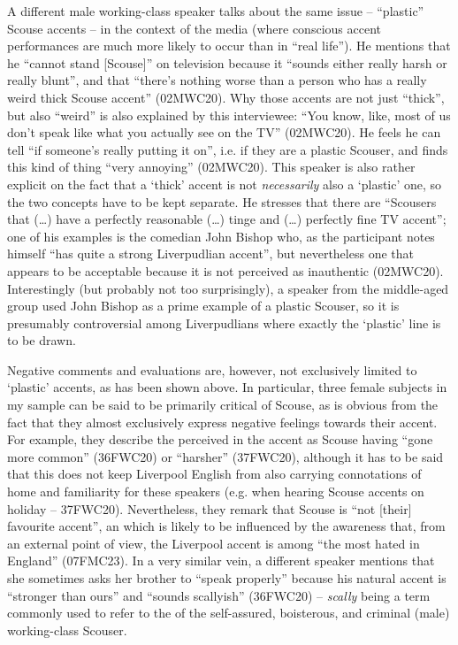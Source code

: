 A different male working-class speaker talks about the same issue -- ``plastic'' Scouse accents -- in the context of the media (where conscious accent perfor\-mances are much more likely to occur than in ``real life'').
He mentions that he ``cannot stand [Scouse]'' on television because it ``sounds either really harsh or really blunt'', and that ``there's nothing worse than a person who has a really weird thick Scouse accent'' (02MWC20).
Why those accents are not just ``thick'', but also ``weird'' is also explained by this interviewee: ``You know, like, most of us don't speak like what you actually see on the TV'' (02MWC20).
He feels he can tell ``if someone's really putting it on'', i.e. if they are a plastic Scouser, and finds this kind of thing ``very annoying'' (02MWC20).
This speaker is also rather explicit on the fact that a `thick' accent is not \emph{necessarily} also a `plastic' one, so the two concepts have to be kept separate.
He stresses that there are ``Scousers that (\ldots) have a perfectly reasonable (\ldots) tinge and (\ldots) perfectly fine TV accent''; one of his examples is the comedian John Bishop who, as the participant notes himself ``has quite a strong Liverpudlian accent'', but nevertheless one that appears to be acceptable because it is not perceived as inauthentic (02MWC20).
Interestingly (but probably not too surprisingly), a speaker from the middle-aged group used John Bishop as a prime example of a plastic Scouser, so it is presumably controversial among Liverpudlians where exactly the `plastic' line is to be drawn.

Negative comments and evaluations are, however, not exclusively limited to `plastic' accents, as has been shown above.
In particular, three female subjects in my sample can be said to be primarily critical of Scouse, as is obvious from the fact that they almost exclusively express negative feelings towards their accent.
For example, they describe the perceived  in the accent as Scouse having ``gone more common'' (36FWC20) or ``harsher'' (37FWC20), although it has to be said that this does not keep Liverpool English from also carrying connotations of home and familiarity for these speakers (e.g. when hearing Scouse accents on holiday -- 37FWC20).
Nevertheless, they remark that Scouse is ``not [their] favourite accent'', an  which is likely to be influenced by the awareness that, from an external point of view, the Liverpool accent is among ``the most hated in England'' (07FMC23).
In a very similar vein, a different speaker mentions that she sometimes asks her brother to ``speak properly'' because his natural accent is ``stronger than ours'' and ``sounds scallyish'' (36FWC20) -- \emph{scally} being a term commonly used to refer to the  of the self-assured, boisterous, and criminal (male) working-class Scouser.

